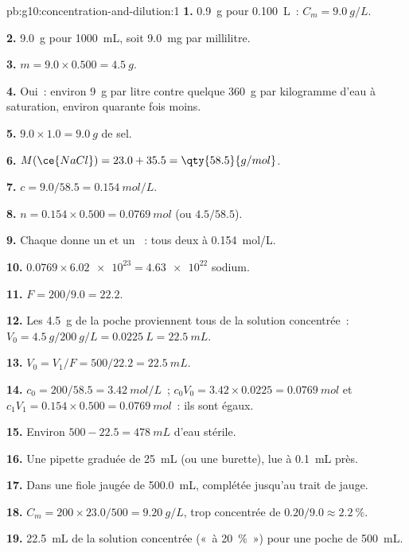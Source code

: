 \begin{solution}{pb:g10:concentration-and-dilution:1}
\textbf{1.} \qty{0.9}{g} pour \qty{0.100}{L}~: $C_m = \qty{9.0}{g/L}$.

\textbf{2.} \qty{9.0}{g} pour \qty{1000}{mL}, soit \qty{9.0}{mg} par
millilitre.

\textbf{3.} $m = 9.0 \times 0.500 = \qty{4.5}{g}$.

\textbf{4.} Oui~: environ \qty{9}{g} par litre contre quelque
\qty{360}{g} par kilogramme d'eau à saturation, environ quarante fois
moins.

\textbf{5.} $9.0 \times 1.0 = \qty{9.0}{g}$ de sel.

\textbf{6.} $M(\ce{NaCl}) = 23.0 + 35.5 = \qty{58.5}{g/mol}$.

\textbf{7.} $c = 9.0 / 58.5 = \qty{0.154}{mol/L}$.

\textbf{8.} $n = 0.154 \times 0.500 = \qty{0.0769}{mol}$ (ou
$4.5 / 58.5$).

\textbf{9.} Chaque  donne un  et un ~: tous deux
à \qty{0.154}{mol/L}.

\textbf{10.} $0.0769 \times \num{6.02e23} = \num{4.63e22}$  sodium.

\textbf{11.} $F = 200 / 9.0 = 22.2$.

\textbf{12.} Les \qty{4.5}{g} de la poche proviennent tous de la
solution concentrée~: $V_0 = \qty{4.5}{g} / \qty{200}{g/L} = \qty{0.0225}{L} =
\qty{22.5}{mL}$.

\textbf{13.} $V_0 = V_1 / F = 500 / 22.2 = \qty{22.5}{mL}$.

\textbf{14.} $c_0 = 200 / 58.5 = \qty{3.42}{mol/L}$~;
$c_0 V_0 = 3.42 \times 0.0225 = \qty{0.0769}{mol}$ et
$c_1 V_1 = 0.154 \times 0.500 = \qty{0.0769}{mol}$~: ils sont égaux.

\textbf{15.} Environ $500 - 22.5 = \qty{478}{mL}$ d'eau stérile.

\textbf{16.} Une pipette graduée de \qty{25}{mL} (ou une burette), lue
à \qty{0.1}{mL} près.

\textbf{17.} Dans une fiole jaugée de \qty{500.0}{mL}, complétée jusqu'au
trait de jauge.

\textbf{18.} $C_m = 200 \times 23.0 / 500 = \qty{9.20}{g/L}$, trop
concentrée de $0.20 / 9.0 \approx \qty{2.2}{\percent}$.

\textbf{19.} \qty{22.5}{mL} de la solution concentrée («~à 20~\%~») pour
une poche de \qty{500}{mL}.
\end{solution}
